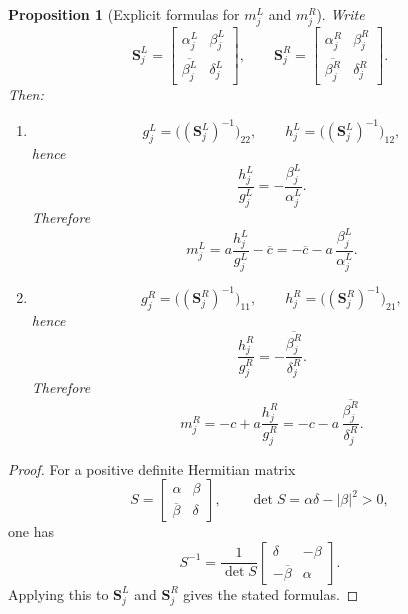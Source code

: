 \documentclass[11pt]{article}
\newtheorem{proposition}[theorem]{Proposition}
\begin{document}
\begin{proposition}[Explicit formulas for \(m_j^L\) and \(m_j^R\)]\label{prop:mLR-from-schur}
Write
\[
\mathbf S_j^L=
\begin{bmatrix}
\alpha_j^L & \beta_j^L\\
\overline{\beta_j^L} & \delta_j^L
\end{bmatrix},
\qquad
\mathbf S_j^R=
\begin{bmatrix}
\alpha_j^R & \beta_j^R\\
\overline{\beta_j^R} & \delta_j^R
\end{bmatrix}.
\]
Then:
\begin{enumerate}
\item
\[
g_j^L=\bigl((\mathbf S_j^L)^{-1}\bigr)_{22},
\qquad
h_j^L=\bigl((\mathbf S_j^L)^{-1}\bigr)_{12},
\]
hence
\[
\frac{h_j^L}{g_j^L}
=
-\frac{\beta_j^L}{\alpha_j^L}.
\]
Therefore
\[
\boxed{
m_j^L
=
a\frac{h_j^L}{g_j^L}-\overline c
=
-\overline c-a\,\frac{\beta_j^L}{\alpha_j^L}.
}
\]

\item
\[
g_j^R=\bigl((\mathbf S_j^R)^{-1}\bigr)_{11},
\qquad
h_j^R=\bigl((\mathbf S_j^R)^{-1}\bigr)_{21},
\]
hence
\[
\frac{h_j^R}{g_j^R}
=
-\frac{\overline{\beta_j^R}}{\delta_j^R}.
\]
Therefore
\[
\boxed{
m_j^R
=
-c+a\frac{h_j^R}{g_j^R}
=
-c-a\,\frac{\overline{\beta_j^R}}{\delta_j^R}.
}
\]
\end{enumerate}
\end{proposition}

\begin{proof}
For a positive definite Hermitian matrix
\[
S=\begin{bmatrix}\alpha&\beta\\ \overline\beta&\delta\end{bmatrix},
\qquad
\det S=\alpha\delta-|\beta|^2>0,
\]
one has
\[
S^{-1}
=
\frac1{\det S}
\begin{bmatrix}
\delta & -\beta\\
-\overline\beta & \alpha
\end{bmatrix}.
\]
Applying this to \(\mathbf S_j^L\) and \(\mathbf S_j^R\) gives the stated formulas.
\end{proof}
\end{document}
